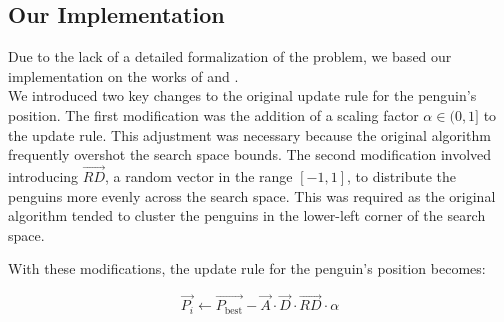 \subsection{Our Implementation}

Due to the lack of a detailed formalization of the problem, we based our implementation on the works of \cite{EPOWIV} and \cite{rosa2019opytimizer}.\\
We introduced two key changes to the original update rule for the penguin's position. The first modification was the addition of a scaling factor $\alpha \in (0,1]$ to the update rule. This adjustment was necessary because the original algorithm frequently overshot the search space bounds. The second modification involved introducing $\vec{RD}$, a random vector in the range $[-1,1]$, to distribute the penguins more evenly across the search space. This was required as the original algorithm tended to cluster the penguins in the lower-left corner of the search space.

With these modifications, the update rule for the penguin's position becomes:

$$ \vec{P_i} \gets \vec{P_{\text{best}}} - \vec{A} \cdot \vec{D} \cdot \vec{RD} \cdot \alpha $$


    

    
        


